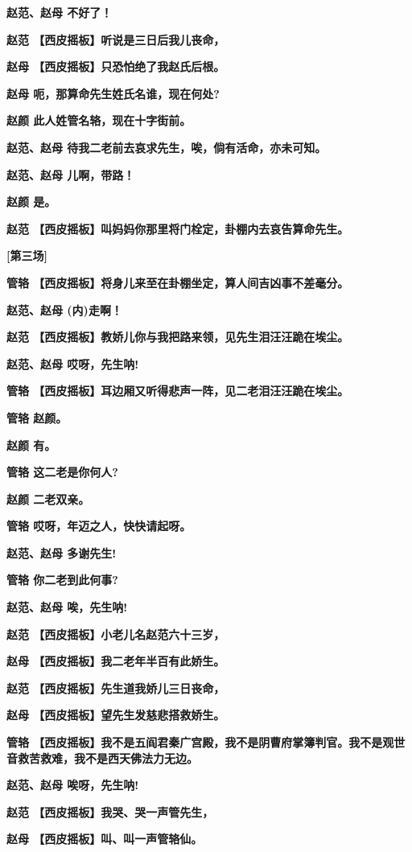 \textbf{赵范、赵母 不好了！}

\textbf{赵范 【西皮摇板】听说是三日后我儿丧命，}

\textbf{赵母 【西皮摇板】只恐怕绝了我赵氏后根。}

\textbf{赵母 呃，那算命先生姓氏名谁，现在何处?}

\textbf{赵颜 此人姓管名辂，现在十字街前。}

\textbf{赵范、赵母 待我二老前去哀求先生，唉，倘有活命，亦未可知。}

\textbf{赵范、赵母 儿啊，带路！}

\textbf{赵颜 是。}

\textbf{赵范 【西皮摇板】叫妈妈你那里将门栓定，卦棚内去哀告算命先生。}

\textbf{{[}第三场{]}}

\textbf{管辂 【西皮摇板】将身儿来至在卦棚坐定，算人间吉凶事不差毫分。}

\textbf{赵范、赵母 (内)走啊！}

\textbf{赵范 【西皮摇板】教娇儿你与我把路来领，见先生泪汪汪跪在埃尘。}

\textbf{赵范、赵母 哎呀，先生呐!}

\textbf{管辂 【西皮摇板】耳边厢又听得悲声一阵，见二老泪汪汪跪在埃尘。}

\textbf{管辂 赵颜。}

\textbf{赵颜 有。}

\textbf{管辂 这二老是你何人?}

\textbf{赵颜 二老双亲。}

\textbf{管辂 哎呀，年迈之人，快快请起呀。}

\textbf{赵范、赵母 多谢先生!}

\textbf{管辂 你二老到此何事?}

\textbf{赵范、赵母 唉，先生呐!}

\textbf{赵范 【西皮摇板】小老儿名赵范六十三岁，}

\textbf{赵母 【西皮摇板】我二老年半百有此娇生。}

\textbf{赵范 【西皮摇板】先生道我娇儿三日丧命，}

\textbf{赵母 【西皮摇板】望先生发慈悲搭救娇生。}

\textbf{管辂
【西皮摇板】我不是五阎君秦广宫殿，我不是阴曹府掌簿判官。我不是观世音救苦救难，我不是西天佛法力无边。}

\textbf{赵范、赵母 唉呀，先生呐!}

\textbf{赵范 【西皮摇板】我哭、哭一声管先生，}

\textbf{赵母 【西皮摇板】叫、叫一声管辂仙。}

